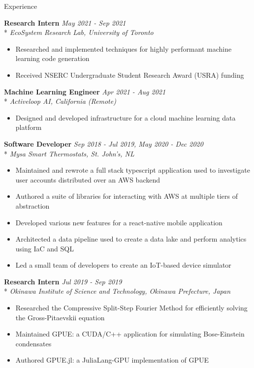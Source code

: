 \documentclass[11pt, letterpaper]{article}
\begin{document}
\begin{section}{Experience}

\textbf{Research Intern}
\hfill
\textit{May 2021 - Sep 2021}\\*
\textit{EcoSystem Research Lab, University of Toronto}
\begin{itemize}
  \item Researched and implemented techniques for highly performant machine learning code generation
  \item Received NSERC Undergraduate Student Research Award (USRA) funding \\
\end{itemize}

\textbf{Machine Learning Engineer}
\hfill
\textit{Apr 2021 - Aug 2021}\\*
\textit{Activeloop AI, California (Remote)}
\begin{itemize}
  \item Designed and developed infrastructure for a cloud machine learning data platform \\
\end{itemize}

\textbf{Software Developer}
\hfill
\textit{Sep 2018 - Jul 2019, May 2020 - Dec 2020}\\*
\textit{Mysa Smart Thermostats, St. John's, NL}
\begin{itemize}
  \item Maintained and rewrote a full stack typescript application used to investigate user accounts distributed over an AWS backend
  \item Authored a suite of libraries for interacting with AWS at multiple tiers of abstraction
  \item Developed various new features for a react-native mobile application
  \item Architected a data pipeline used to create a data lake and perform analytics using IaC and SQL
  \item Led a small team of developers to create an IoT-based device simulator \\
\end{itemize}

\textbf{Research Intern}
\hfill
\textit{Jul 2019 - Sep 2019}\\*
\textit{Okinawa Institute of Science and Technology, Okinawa Prefecture, Japan}
\begin{itemize}
  \item Researched the Compressive Split-Step Fourier Method for efficiently solving the Gross-Pitaevskii equation
  \item Maintained GPUE: a CUDA/C++ application for simulating Bose-Einstein condensates
  \item Authored GPUE.jl: a JuliaLang-GPU implementation of GPUE
\end{itemize}

\end{section}
\end{document}
